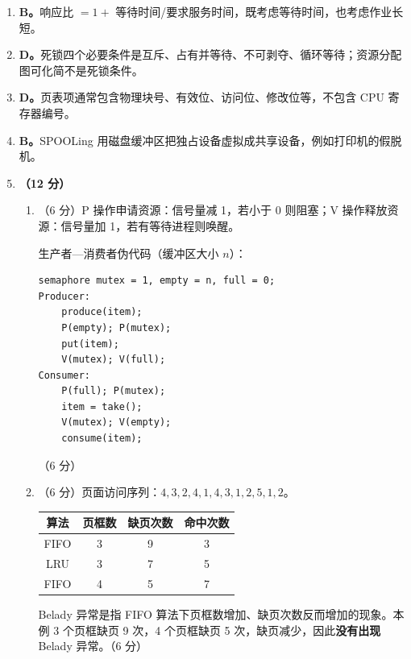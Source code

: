 \documentclass[a4paper,11pt]{article}
\begin{document}
\begin{enumerate}[start=1, label=\textbf{\arabic*.}, leftmargin=2.4em, itemsep=0.45em]
\end{enumerate}


\begin{enumerate}[start=8, label=\textbf{\arabic*.}, leftmargin=2.4em, itemsep=0.45em]

\item \textbf{B。}响应比 $=1+$ 等待时间/要求服务时间，既考虑等待时间，也考虑作业长短。

\item \textbf{D。}死锁四个必要条件是互斥、占有并等待、不可剥夺、循环等待；资源分配图可化简不是死锁条件。

\item \textbf{D。}页表项通常包含物理块号、有效位、访问位、修改位等，不包含 CPU 寄存器编号。

\item \textbf{B。}SPOOLing 用磁盘缓冲区把独占设备虚拟成共享设备，例如打印机的假脱机。

\item \textbf{（12 分）}
\begin{enumerate}[label=（\arabic*）, leftmargin=2.2em, itemsep=2pt]
  \item （6 分）P 操作申请资源：信号量减 1，若小于 0 则阻塞；V 操作释放资源：信号量加 1，若有等待进程则唤醒。
  
  生产者—消费者伪代码（缓冲区大小 $n$）：
\begin{lstlisting}
semaphore mutex = 1, empty = n, full = 0;
Producer:
    produce(item);
    P(empty); P(mutex);
    put(item);
    V(mutex); V(full);
Consumer:
    P(full); P(mutex);
    item = take();
    V(mutex); V(empty);
    consume(item);
\end{lstlisting}
  \hfill（6 分）

  \item （6 分）页面访问序列：$4,3,2,4,1,4,3,1,2,5,1,2$。
  \begin{center}\small
  \begin{tabular}{cccc}
  \toprule
  算法 & 页框数 & 缺页次数 & 命中次数 \\
  \midrule
  FIFO & 3 & 9 & 3 \\
  LRU & 3 & 7 & 5 \\
  FIFO & 4 & 5 & 7 \\
  \bottomrule
  \end{tabular}
  \end{center}
  Belady 异常是指 FIFO 算法下页框数增加、缺页次数反而增加的现象。本例 3 个页框缺页 9 次，4 个页框缺页 5 次，缺页减少，因此\textbf{没有出现} Belady 异常。\hfill（6 分）
\end{enumerate}

\end{enumerate}
\end{document}
